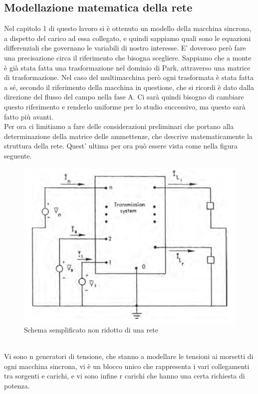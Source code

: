 \documentclass[Lau,noexaminfo]{sapthesis}
\begin{document}
	\subsection{Modellazione matematica della rete}
	Nel capitolo 1 di questo lavoro si è ottenuto un modello della macchina sincrona, a dispetto del carico ad essa collegato, e quindi sappiamo quali sono le equazioni differenziali che governano le variabili di nostro interesse. E' doveroso però fare una precisazione circa il riferimento che bisogna scegliere. Sappiamo che a monte è già stata fatta una trasformazione nel dominio di Park, attraverso una matrice di trasformazione. Nel caso del multimacchina però ogni trasformata è stata fatta a sé, secondo il riferimento della macchina in questione, che si ricordi è dato dalla direzione del flusso del campo nella fase A. Ci sarà quindi bisogno di cambiare questo riferimento e renderlo uniforme per lo studio successivo, ma questo sarà fatto più avanti.\\
	Per ora ci limitiamo a fare delle considerazioni preliminari che portano alla determinazione della matrice delle ammettenze, che descrive matematicamente la struttura della rete. Quest' ultima per ora può essere vista come nella figura seguente.\\
	\begin{figure}
		\centering
		\includegraphics[height=0.35\textheight]{nonridotta}
		\caption{Schema semplificato non ridotto di una rete}
	\end{figure}
	\\
	Vi sono n generatori di tensione, che stanno a modellare le tensioni ai morsetti di ogni macchina sincrona, vi è un blocco unico che rappresenta i vari collegamenti tra sorgenti e carichi, e vi sono infine r carichi che hanno una certa richiesta di potenza.
\end{document}
